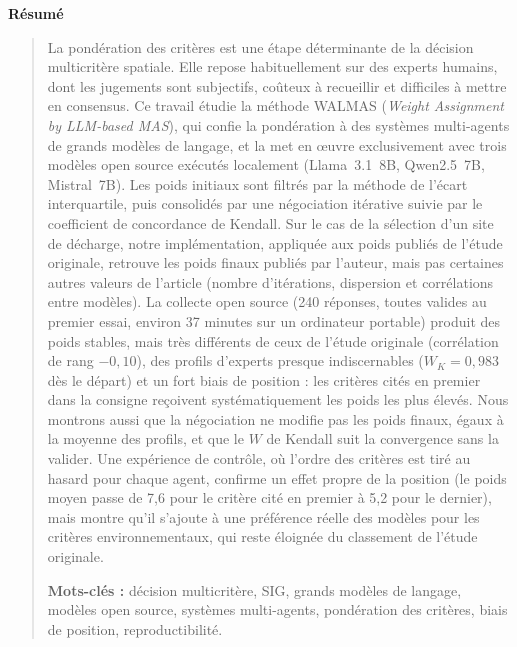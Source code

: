 \documentclass[11pt,a4paper]{article}
\begin{document}
\vspace{0.4cm}
\begin{center}\bfseries Résumé\end{center}
\vspace{-0.3cm}
\begin{quote}
\small
La pondération des critères est une étape déterminante de la décision multicritère spatiale. Elle repose habituellement sur des experts humains, dont les jugements sont subjectifs, coûteux à recueillir et difficiles à mettre en consensus. Ce travail étudie la méthode WALMAS (\emph{Weight Assignment by LLM-based MAS}), qui confie la pondération à des systèmes multi-agents de grands modèles de langage, et la met en œuvre exclusivement avec trois modèles open source exécutés localement (Llama~3.1~8B, Qwen2.5~7B, Mistral~7B). Les poids initiaux sont filtrés par la méthode de l'écart interquartile, puis consolidés par une négociation itérative suivie par le coefficient de concordance de Kendall. Sur le cas de la sélection d'un site de décharge, notre implémentation, appliquée aux poids publiés de l'étude originale, retrouve les poids finaux publiés par l'auteur, mais pas certaines autres valeurs de l'article (nombre d'itérations, dispersion et corrélations entre modèles). La collecte open source (240 réponses, toutes valides au premier essai, environ 37 minutes sur un ordinateur portable) produit des poids stables, mais très différents de ceux de l'étude originale (corrélation de rang $-0{,}10$), des profils d'experts presque indiscernables ($W_K=0{,}983$ dès le départ) et un fort biais de position : les critères cités en premier dans la consigne reçoivent systématiquement les poids les plus élevés. Nous montrons aussi que la négociation ne modifie pas les poids finaux, égaux à la moyenne des profils, et que le $W$ de Kendall suit la convergence sans la valider.
Une expérience de contrôle, où l'ordre des critères est tiré au hasard pour chaque agent, confirme un effet propre de la position (le poids moyen passe de 7,6 pour le critère cité en premier à 5,2 pour le dernier), mais montre qu'il s'ajoute à une préférence réelle des modèles pour les critères environnementaux, qui reste éloignée du classement de l'étude originale.

\smallskip
\noindent\textbf{Mots-clés :} décision multicritère, SIG, grands modèles de langage, modèles open source, systèmes multi-agents, pondération des critères, biais de position, reproductibilité.
\end{quote}

\end{document}
